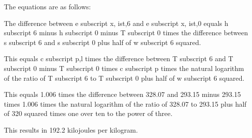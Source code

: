 The equations are as follows:

The difference between e subscript x, ist,6 and e subscript x, ist,0 equals h subscript 6 minus h subscript 0 minus T subscript 0 times the difference between s subscript 6 and s subscript 0 plus half of w subscript 6 squared.

This equals c subscript p,l times the difference between T subscript 6 and T subscript 0 minus T subscript 0 times c subscript p times the natural logarithm of the ratio of T subscript 6 to T subscript 0 plus half of w subscript 6 squared.

This equals 1.006 times the difference between 328.07 and 293.15 minus 293.15 times 1.006 times the natural logarithm of the ratio of 328.07 to 293.15 plus half of 320 squared times one over ten to the power of three.

This results in 192.2 kilojoules per kilogram.